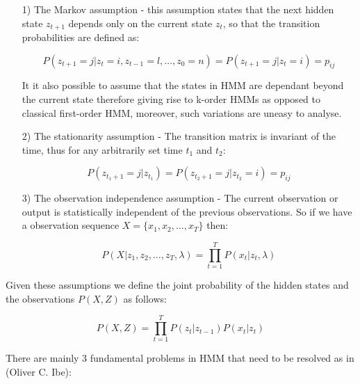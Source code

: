 \begin{itemize}
\item[1)] The Markov assumption - this assumption states that the next hidden state $z_{t+1}$ depends only on the current state $z_t$, so that the transition probabilities are defined as:

\begin{equation}
P(z_{t+1} = j| z_{t} = i,z_{t-1} = l,\ldots,z_{0} = n) = P(z_{t+1} = j| z_{t} = i) = p_{ij}
\end{equation}

It it also possible to assume that the states in HMM are dependant beyond the current state therefore giving rise to k-order HMMs as opposed to classical first-order HMM, moreover, such variations are uneasy to analyse.

\item[2)] The stationarity assumption - The transition matrix is invariant of the time, thus for any arbitrarily set time $t_1$ and $t_2$:

\begin{equation}
P(z_{t_1+1} = j| z_{t_1}) = P(z_{t_2+1} = j| z_{t_2} = i) = p_{ij}
\end{equation}

\item[3)] The observation independence assumption - The current observation or output is statistically independent of the previous observations. So if we have a observation sequence $X = \{x_1,x_2,\ldots,x_T\}$ then:

\begin{equation}
P(X|z_1,z_2,\ldots,z_T, \lambda) = \prod_{t=1}^T P(x_t|z_t,\lambda)
\end{equation}

\end{itemize}

Given these assumptions we define the joint probability of the hidden states and the observations $P(X,Z)$ as follows:

\begin{equation}
P(X, Z) = \prod_{t=1}^T P(z_t|z_{t-1}) P(x_t|z_t)
\end{equation}



There are mainly 3 fundamental problems in HMM that need to be resolved as in (Oliver C. Ibe):

